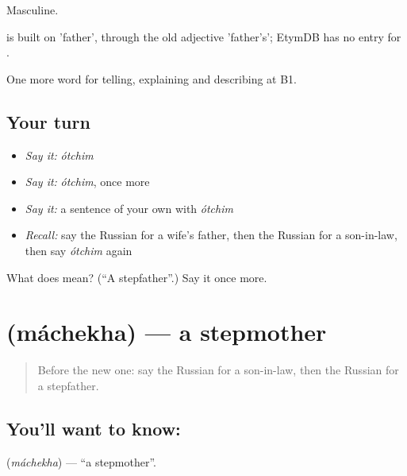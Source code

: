 Masculine.

\begin{cousinweb}
\emph{} is built on \emph{} 'father', through the old adjective \emph{} 'father's'; EtymDB has no entry for \emph{}.
\end{cousinweb}

\begin{grammarlens}[title={What you've built}]
One more word for telling, explaining and describing at B1.
\end{grammarlens}

\subsection*{Your turn}
\begin{itemize}
\raggedright
  \item \emph{Say it:} \emph{ótchim}
  \item \emph{Say it:} \emph{ótchim}, once more
  \item \emph{Say it:} a sentence of your own with \emph{ótchim}
  \item \emph{Recall:} say the Russian for a wife's father, then the Russian for a son-in-law, then say \emph{ótchim} again
\end{itemize}

\begin{tcolorbox}[breakable,colback=teal!4,colframe=teal!35!black,title={Before you move on}]
What does  mean? (\textquotedblleft{}A stepfather\textquotedblright{}.) Say it once more.
\end{tcolorbox}
\section[\texorpdfstring{\ru{мачеха} (máchekha)}{мачеха (máchekha)}]{ (máchekha) — a stepmother}

\label{lesson:RU-C492-machekha}



\begin{quote}
Before the new one: say the Russian for a son-in-law, then the Russian for a stepfather.
\end{quote}

\subsection*{You'll want to know: }
\textbf{} (\emph{máchekha}) — \textquotedblleft{}a stepmother\textquotedblright{}.

